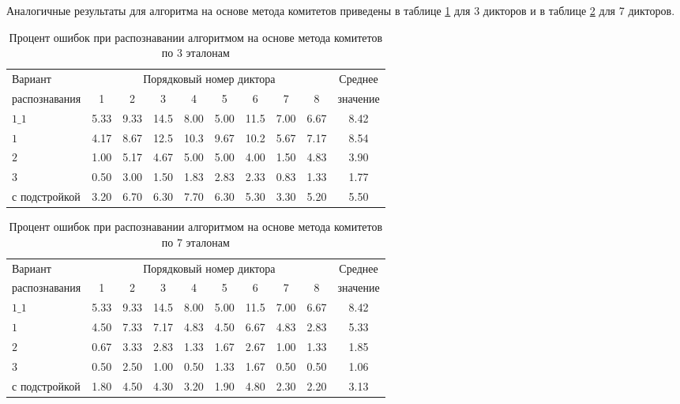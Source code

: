 Аналогичные результаты для алгоритма на основе метода комитетов приведены в таблице \ref{tab:subsect3_2_3_tab3} для 3 дикторов и в таблице \ref{tab:subsect3_2_3_tab4} для 7 дикторов.

\begin{table}[h]
	\centering
	\caption{Процент ошибок при распознавании алгоритмом на основе метода комитетов по 3 эталонам}
	\label{tab:subsect3_2_3_tab3}
	\begin{tabular}{| l | c | c | c | c | c | c | c | c | c |}
		\hline
		Вариант & \multicolumn{8}{c|}{Порядковый номер диктора} & Среднее \\
		\hhline{~--------}
		распознавания & \phantom{0} 1 \phantom{0} & \phantom{0} 2 \phantom{0} & \phantom{0} 3 \phantom{0} & \phantom{0} 4 \phantom{0} & \phantom{0} 5 \phantom{0} & \phantom{0} 6 \phantom{0} & \phantom{0} 7 \phantom{0} & \phantom{0} 8 \phantom{0} & значение \\
		\hline
		$1\_1$			& 5.33 & 9.33 & 14.5 & 8.00 & 5.00 & 11.5 & 7.00 & 6.67 & 8.42 \\
		$1$				& 4.17 & 8.67 & 12.5 & 10.3 & 9.67 & 10.2 & 5.67 & 7.17 & 8.54 \\
		$2$				& 1.00 & 5.17 & 4.67 & 5.00 & 5.00 & 4.00 & 1.50 & 4.83 & 3.90 \\
		$3$				& 0.50 & 3.00 & 1.50 & 1.83 & 2.83 & 2.33 & 0.83 & 1.33 & 1.77 \\
		с подстройкой	& 3.20 & 6.70 & 6.30 & 7.70 & 6.30 & 5.30 & 3.30 & 5.20 & 5.50 \\
		\hline
	\end{tabular}
\end{table}

\begin{table}[h]
	\centering
	\caption{Процент ошибок при распознавании алгоритмом на основе метода комитетов по 7 эталонам}
	\label{tab:subsect3_2_3_tab4}
	\begin{tabular}{| l | c | c | c | c | c | c | c | c | c |}
		\hline
		Вариант & \multicolumn{8}{c|}{Порядковый номер диктора} & Среднее \\
		\hhline{~--------}
		распознавания & \phantom{0} 1 \phantom{0} & \phantom{0} 2 \phantom{0} & \phantom{0} 3 \phantom{0} & \phantom{0} 4 \phantom{0} & \phantom{0} 5 \phantom{0} & \phantom{0} 6 \phantom{0} & \phantom{0} 7 \phantom{0} & \phantom{0} 8 \phantom{0} & значение \\
		\hline
		$1\_1$			& 5.33 & 9.33 & 14.5 & 8.00 & 5.00 & 11.5 & 7.00 & 6.67 & 8.42 \\
		$1$				& 4.50 & 7.33 & 7.17 & 4.83 & 4.50 & 6.67 & 4.83 & 2.83 & 5.33 \\
		$2$				& 0.67 & 3.33 & 2.83 & 1.33 & 1.67 & 2.67 & 1.00 & 1.33 & 1.85 \\
		$3$				& 0.50 & 2.50 & 1.00 & 0.50 & 1.33 & 1.67 & 0.50 & 0.50 & 1.06 \\
		с подстройкой	& 1.80 & 4.50 & 4.30 & 3.20 & 1.90 & 4.80 & 2.30 & 2.20 & 3.13 \\
		\hline
	\end{tabular}
\end{table}

